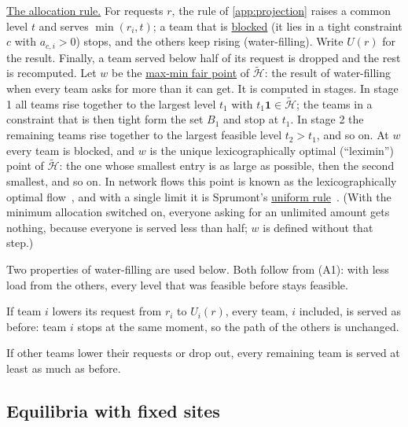 \documentclass[10pt]{article}
\newcommand{\alert}[1]{{\color{alertblue}\uline{#1}}}
\begin{document}
\alert{The allocation rule.} For requests $r$, the rule of
\cref{app:projection} raises a common level $t$ and serves
$\min(r_i, t)$; a team that is \alert{blocked} (it lies in a tight constraint
$c$ with $a_{c,i} > 0$) stops, and the others keep rising (water-filling).
Write $U(r)$ for the result. Finally, a team served below half of its request
is dropped and the rest is recomputed. Let $w$ be the \alert{max-min fair
point} of $\widetilde{\mathcal H}$: the result of water-filling when every
team asks for more than it can get. It is computed in stages. In stage 1 all
teams rise together to the largest level $t_1$ with $t_1 \mathbf 1 \in
\widetilde{\mathcal H}$; the teams in a constraint that is then tight form the
set $B_1$ and stop at $t_1$. In stage 2 the remaining teams rise together to
the largest feasible level $t_2 > t_1$, and so on. At $w$ every team is
blocked, and $w$ is the unique lexicographically optimal (``leximin'') point of
$\widetilde{\mathcal H}$: the one whose smallest entry is as large as
possible, then the second smallest, and so on. In network flows this point is
known as the lexicographically optimal flow~\cite{megiddo1974optimal}, and with
a single limit it is Sprumont's \alert{uniform rule}~\cite{sprumont1991division}.
(With the minimum allocation switched on, everyone asking for an unlimited
amount gets nothing, because everyone is served less than half; $w$ is defined
without that step.)

Two properties of water-filling are used below. Both follow from (A1): with
less load from the others, every level that was feasible before stays
feasible.
\begin{description}[leftmargin=1.5em,style=nextline]
  \item[P1. Asking for what you get changes nothing.] If team $i$ lowers its
    request from $r_i$ to $U_i(r)$, every team, $i$ included, is served as
    before: team $i$ stops at the same moment, so the path of the others is
    unchanged.
  \item[P2. Fewer or smaller rivals never hurt.] If other teams lower their
    requests or drop out, every remaining team is served at least as much as
    before.
\end{description}

\subsection{Equilibria with fixed sites}
\end{document}
